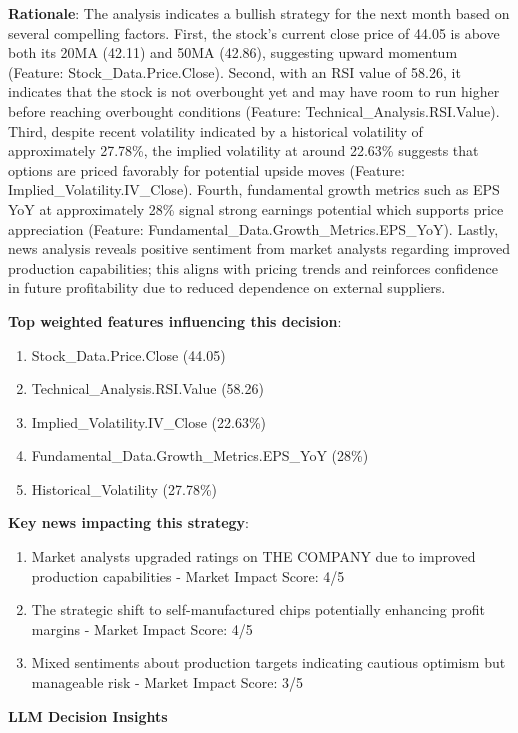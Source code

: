 \documentclass[8pt]{scrartcl}
\begin{document}
\textbf{Rationale}: The analysis indicates a bullish strategy for the next month based on several compelling factors. First, the stock's current close price of 44.05 is above both its 20MA (42.11) and 50MA (42.86), suggesting upward momentum (Feature: Stock\_Data.Price.Close). Second, with an RSI value of 58.26, it indicates that the stock is not overbought yet and may have room to run higher before reaching overbought conditions (Feature: Technical\_Analysis.RSI.Value). Third, despite recent volatility indicated by a historical volatility of approximately 27.78\%, the implied volatility at around 22.63\% suggests that options are priced favorably for potential upside moves (Feature: Implied\_Volatility.IV\_Close). Fourth, fundamental growth metrics such as EPS YoY at approximately 28\% signal strong earnings potential which supports price appreciation (Feature: Fundamental\_Data.Growth\_Metrics.EPS\_YoY). Lastly, news analysis reveals positive sentiment from market analysts regarding improved production capabilities; this aligns with pricing trends and reinforces confidence in future profitability due to reduced dependence on external suppliers.

\textbf{Top weighted features influencing this decision}:
\begin{enumerate}
    \item Stock\_Data.Price.Close (44.05)
    \item Technical\_Analysis.RSI.Value (58.26)
    \item Implied\_Volatility.IV\_Close (22.63\%)
    \item Fundamental\_Data.Growth\_Metrics.EPS\_YoY (28\%)
    \item Historical\_Volatility (27.78\%)
\end{enumerate}

\textbf{Key news impacting this strategy}:
\begin{enumerate}
    \item Market analysts upgraded ratings on THE COMPANY due to improved production capabilities - Market Impact Score: 4/5
    \item The strategic shift to self-manufactured chips potentially enhancing profit margins - Market Impact Score: 4/5
    \item Mixed sentiments about production targets indicating cautious optimism but manageable risk - Market Impact Score: 3/5
\end{enumerate}

\textbf{LLM Decision Insights}
\end{document}

